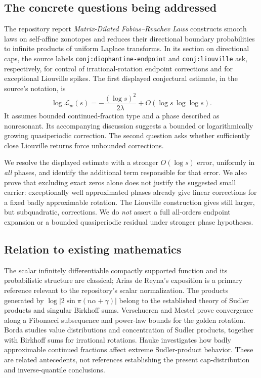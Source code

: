 \documentclass[11pt,a4paper]{article}
\theoremstyle{definition}
\theoremstyle{remark}\newtheorem{remark}[theorem]{Remark}
\newcommand{\LL}{\mathcal L}
\begin{document}
\subsection{The concrete questions being addressed}

The repository report \emph{Matrix-Dilated Fabius--Rvachev Laws}
\cite{RepoMatrix} constructs smooth laws on self-affine zonotopes and reduces
their directional boundary probabilities to infinite products of uniform
Laplace transforms.  In its section on directional caps, the source labels
\texttt{conj:diophantine-endpoint} and \texttt{conj:liouville} ask, respectively,
for control of irrational-rotation endpoint corrections and for exceptional
Liouville spikes.  The first displayed conjectural estimate, in the source's
notation, is
\begin{equation}
 \log\LL_w(s)=-\frac{(\log s)^2}{2\lambda}
       +O(\log s\,\log\log s).
 \label{eq:repoestimate}
\end{equation}
It assumes bounded continued-fraction type and a phase described as
nonresonant.  Its accompanying discussion suggests a bounded or
logarithmically growing quasiperiodic correction.  The second question asks
whether sufficiently close Liouville returns force unbounded corrections.

We resolve the displayed estimate with a stronger $O(\log s)$ error, uniformly
in \emph{all} phases, and identify the additional term responsible for that
error.  We also prove that excluding exact zeros alone does not justify the
suggested small carrier: exceptionally well approximated phases already give
linear corrections for a fixed badly approximable rotation.  The Liouville
construction gives still larger, but subquadratic, corrections.  We do
\emph{not} assert a full all-orders endpoint expansion or a bounded
quasiperiodic residual under stronger phase hypotheses.

\subsection{Relation to existing mathematics}

The scalar infinitely differentiable compactly supported function and its
probabilistic structure are classical; Arias de Reyna's exposition
\cite{Arias} is a primary reference relevant to the repository's scalar
normalization.  The products generated by
$\log|2\sin\pi(n\alpha+\gamma)|$ belong to the established theory of Sudler
products and singular Birkhoff sums.  Verschueren and Mestel
\cite{VerschuerenMestel} prove convergence along a Fibonacci subsequence and
power-law bounds for the golden rotation.  Borda \cite{Borda} studies value
distributions and concentration of Sudler products, together with Birkhoff
sums for irrational rotations.  Hauke \cite{Hauke} investigates how badly
approximable continued fractions affect extreme Sudler-product behavior.
These are related antecedents, not references establishing the present
cap-distribution and inverse-quantile conclusions.
\end{document}
